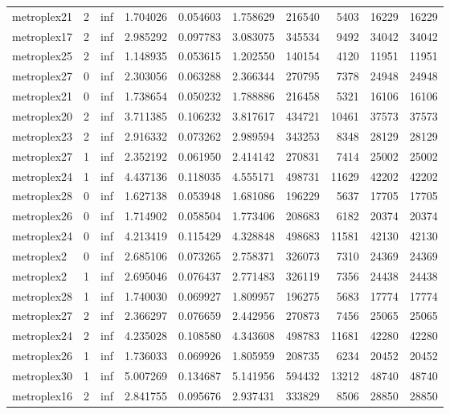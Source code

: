 \begin{longtable}{|l|r|r|r|r|r|r|r|r|r|}
metroplex21 & 2 & inf & 1.704026 & 0.054603 & 1.758629 & 216540 & 5403 & 16229 & 16229 \\
metroplex17 & 2 & inf & 2.985292 & 0.097783 & 3.083075 & 345534 & 9492 & 34042 & 34042 \\
metroplex25 & 2 & inf & 1.148935 & 0.053615 & 1.202550 & 140154 & 4120 & 11951 & 11951 \\
metroplex27 & 0 & inf & 2.303056 & 0.063288 & 2.366344 & 270795 & 7378 & 24948 & 24948 \\
metroplex21 & 0 & inf & 1.738654 & 0.050232 & 1.788886 & 216458 & 5321 & 16106 & 16106 \\
metroplex20 & 2 & inf & 3.711385 & 0.106232 & 3.817617 & 434721 & 10461 & 37573 & 37573 \\
metroplex23 & 2 & inf & 2.916332 & 0.073262 & 2.989594 & 343253 & 8348 & 28129 & 28129 \\
metroplex27 & 1 & inf & 2.352192 & 0.061950 & 2.414142 & 270831 & 7414 & 25002 & 25002 \\
metroplex24 & 1 & inf & 4.437136 & 0.118035 & 4.555171 & 498731 & 11629 & 42202 & 42202 \\
metroplex28 & 0 & inf & 1.627138 & 0.053948 & 1.681086 & 196229 & 5637 & 17705 & 17705 \\
metroplex26 & 0 & inf & 1.714902 & 0.058504 & 1.773406 & 208683 & 6182 & 20374 & 20374 \\
metroplex24 & 0 & inf & 4.213419 & 0.115429 & 4.328848 & 498683 & 11581 & 42130 & 42130 \\
metroplex2 & 0 & inf & 2.685106 & 0.073265 & 2.758371 & 326073 & 7310 & 24369 & 24369 \\
metroplex2 & 1 & inf & 2.695046 & 0.076437 & 2.771483 & 326119 & 7356 & 24438 & 24438 \\
metroplex28 & 1 & inf & 1.740030 & 0.069927 & 1.809957 & 196275 & 5683 & 17774 & 17774 \\
metroplex27 & 2 & inf & 2.366297 & 0.076659 & 2.442956 & 270873 & 7456 & 25065 & 25065 \\
metroplex24 & 2 & inf & 4.235028 & 0.108580 & 4.343608 & 498783 & 11681 & 42280 & 42280 \\
metroplex26 & 1 & inf & 1.736033 & 0.069926 & 1.805959 & 208735 & 6234 & 20452 & 20452 \\
metroplex30 & 1 & inf & 5.007269 & 0.134687 & 5.141956 & 594432 & 13212 & 48740 & 48740 \\
metroplex16 & 2 & inf & 2.841755 & 0.095676 & 2.937431 & 333829 & 8506 & 28850 & 28850 \\

\end{longtable}
